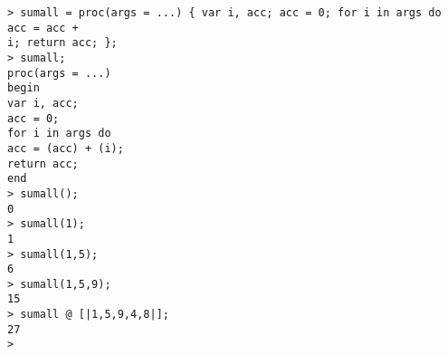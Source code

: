 \begin{center}\begin{minipage}{15cm}\begin{Verbatim}[frame=single]
> sumall = proc(args = ...) { var i, acc; acc = 0; for i in args do acc = acc + 
i; return acc; };
> sumall;
proc(args = ...)
begin
var i, acc;
acc = 0;
for i in args do
acc = (acc) + (i);
return acc;
end
> sumall();
0
> sumall(1);
1
> sumall(1,5);
6
> sumall(1,5,9);
15
> sumall @ [|1,5,9,4,8|];
27
> 
\end{Verbatim}
\end{minipage}\end{center}
